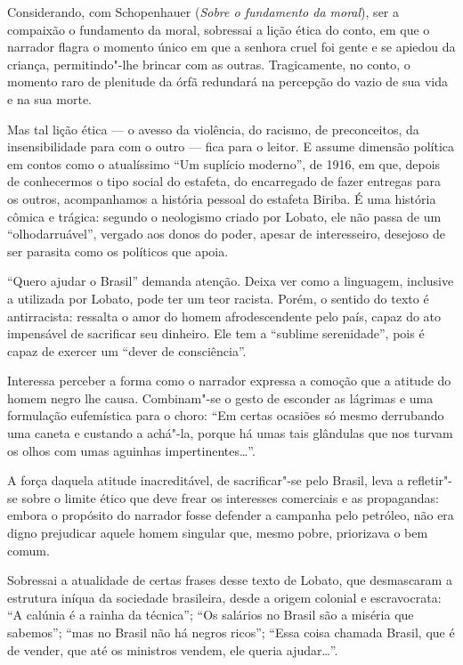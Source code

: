 Considerando, com Schopenhauer (\emph{Sobre o fundamento da moral}), ser
a compaixão o fundamento da moral, sobressai a lição ética do conto, em
que o narrador flagra o momento único em que a senhora cruel foi gente e
se apiedou da criança, permitindo"-lhe brincar com as outras.
Tragicamente, no conto, o momento raro de plenitude da órfã redundará na
percepção do vazio de sua vida e na sua morte.

Mas tal lição ética --- o avesso da violência, do racismo, de
preconceitos, da insensibilidade para com o outro --- fica para o leitor.
E assume dimensão política em contos como o atualíssimo ``Um suplício
moderno'', de 1916, em que, depois de conhecermos o tipo social do
estafeta, do encarregado de fazer entregas para os outros, acompanhamos
a história pessoal do estafeta Biriba. É uma história cômica e trágica:
segundo o neologismo criado por Lobato, ele não passa de um
``olhodarruável'', vergado aos donos do poder, apesar de interesseiro,
desejoso de ser parasita como os políticos que apoia.

``Quero ajudar o Brasil'' demanda atenção. Deixa ver como a linguagem,
inclusive a utilizada por Lobato, pode ter um teor racista. Porém, o
sentido do texto é antirracista: ressalta o amor do homem
afrodescendente pelo país, capaz do ato impensável de sacrificar seu
dinheiro. Ele tem a ``sublime serenidade'', pois é capaz de exercer um
``dever de consciência''.

Interessa perceber a forma como o narrador expressa a comoção que a
atitude do homem negro lhe causa. Combinam"-se o gesto de esconder as
lágrimas e uma formulação eufemística para o choro: ``Em certas ocasiões
só mesmo derrubando uma caneta e custando a achá"-la, porque há umas tais
glândulas que nos turvam os olhos com umas aguinhas
impertinentes\ldots{}''.

A força daquela atitude inacreditável, de sacrificar"-se pelo Brasil,
leva a refletir"-se sobre o limite ético que deve frear os interesses
comerciais e as propagandas: embora o propósito do narrador fosse
defender a campanha pelo petróleo, não era digno prejudicar aquele homem
singular que, mesmo pobre, priorizava o bem comum.

Sobressai a atualidade de certas frases desse texto de Lobato, que
desmascaram a estrutura iníqua da sociedade brasileira, desde a origem
colonial e escravocrata: ``A calúnia é a rainha da técnica''; ``Os
salários no Brasil são a miséria que sabemos''; ``mas no Brasil não há
negros ricos''; ``Essa coisa chamada Brasil, que é de vender, que até os
ministros vendem, ele queria ajudar\ldots{}''.


